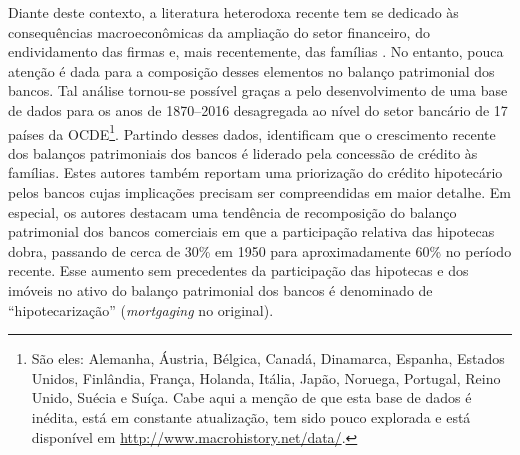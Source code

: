 Diante deste contexto, a literatura heterodoxa recente tem se dedicado às consequências macroeconômicas  da ampliação do setor financeiro, do endividamento das firmas  e, mais recentemente, das famílias  \cites{carvalho_income_2014}{hein_demise_2015}{detzer_financialization_2019}.
No entanto, pouca atenção é dada para a composição desses elementos no balanço patrimonial dos bancos.
Tal análise tornou-se possível graças a \textcite{jorda_rate_2019} pelo desenvolvimento de uma base de dados para os anos de 1870--2016 desagregada ao nível do setor bancário de 17 países da OCDE\footnote{São eles: Alemanha, Áustria, Bélgica, Canadá, Dinamarca, Espanha, Estados Unidos, Finlândia, França, Holanda, Itália, Japão, Noruega, Portugal, Reino Unido, Suécia e Suíça. Cabe aqui a menção de que esta base de dados é inédita, está em constante atualização, tem sido pouco explorada e está disponível em \url{http://www.macrohistory.net/data/}.\label{nota_paises}}.
Partindo desses dados, \textcite{jorda_great_2016} identificam que o crescimento recente dos balanços patrimoniais dos bancos é liderado pela concessão de crédito às famílias.
Estes autores também reportam uma priorização do crédito hipotecário  pelos bancos
cujas implicações precisam ser compreendidas em maior detalhe. 
Em especial, os autores destacam uma tendência de recomposição do balanço patrimonial dos bancos comerciais em que a participação relativa das hipotecas dobra, passando de cerca de 30\% em 1950 para aproximadamente 60\% no período recente. %
Esse aumento sem precedentes da participação das hipotecas e dos imóveis no ativo do balanço patrimonial dos bancos é denominado de ``hipotecarização'' (\textit{mortgaging} no original).

